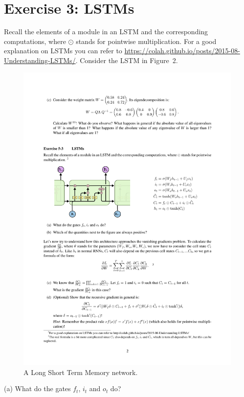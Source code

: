 \documentclass[12pt]{article}
\begin{document}
\clearpage
\section{\begingroup \large Exercise 3: LSTMs \endgroup}
 
 \noindent Recall the elements of a module in an LSTM and the corresponding computations, where $\odot$ stands for pointwise multiplication. For a good explanation on LSTMs you can refer to \url{https://colah.github.io/posts/2015-08-Understanding-LSTMs/}. Consider the LSTM in Figure~2.
\begin{figure}[t]
\label{fig:lstms}
\centering
\includegraphics[scale=1.0]{lstm.pdf}
\vspace{-1em}
\caption{A Long Short Term Memory network.}
\end{figure}
 
 (a) What do the gates $f_t$, $i_t$ and $o_t$ do? \\
\end{document}
